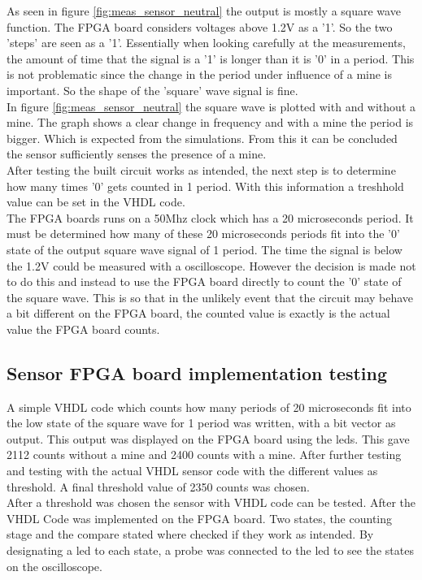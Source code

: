 As seen in figure \ref{fig:meas_sensor_neutral} the output is mostly a square wave function. The FPGA board considers voltages above 1.2V as a '1'. So the two 'steps' are seen as a '1'. Essentially when looking carefully at the measurements, the amount of time that the signal is a '1' is longer than it is '0' in a period. This is not problematic since the change in the period under influence of a mine is important. So the shape of the 'square' wave signal is fine.\\
In figure \ref{fig:meas_sensor_neutral} the square wave is plotted with and without a mine. The graph shows a clear change in frequency and with a mine the period is bigger. Which is expected from the simulations. From this it can be concluded the sensor sufficiently senses the presence of a mine.\\
After testing the built circuit works as intended, the next step is to determine how many times '0' gets counted in 1 period. With this information a treshhold value can be set in the VHDL code.\\
The FPGA boards runs on a 50Mhz clock which has a 20 microseconds period. It must be determined how many of these 20 microseconds periods fit into the '0' state of the output square wave signal of 1 period. The time the signal is below the 1.2V could be measured with a oscilloscope. However the decision is made not to do this and instead to use the FPGA board directly to count the '0' state of the square wave. This is so that in the unlikely event that the circuit may behave a bit different on the FPGA board, the counted value is exactly is the actual value the FPGA board counts.


\newpage
\subsection{Sensor FPGA board implementation testing}
A simple VHDL code which counts how many periods of 20 microseconds fit into the low state of the square wave for 1 period was written, with a bit vector as output. This output was displayed on the FPGA board using the leds. This gave 2112 counts without a mine and 2400 counts with a mine.
After further testing and testing with the actual VHDL sensor code with the different values as threshold. A final threshold value of 2350 counts was chosen.\\

After a threshold was chosen the sensor with VHDL code can be tested. After the VHDL Code was implemented on the FPGA board. Two states, the counting stage and the compare stated where checked if they work as intended. By designating a led to each state, a probe was connected to the led to see the states on the oscilloscope.

